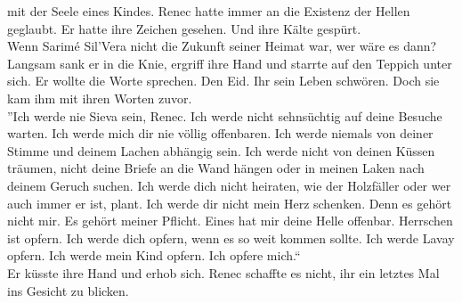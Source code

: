 mit der Seele eines Kindes. Renec hatte immer an die Existenz der Hellen geglaubt. Er hatte ihre 
Zeichen gesehen. Und ihre Kälte gespürt.\\
Wenn Sarimé Sil'Vera nicht die Zukunft seiner Heimat war, wer wäre es dann?\\
Langsam sank er in die Knie, ergriff ihre Hand und starrte auf den Teppich unter sich. Er wollte 
die Worte sprechen. Den Eid. Ihr sein Leben schwören. Doch sie kam ihm mit ihren Worten zuvor.\\
''Ich werde nie Sieva sein, Renec. Ich werde nicht sehnsüchtig auf deine Besuche warten. Ich werde 
mich dir nie völlig offenbaren. Ich werde niemals von deiner Stimme und deinem Lachen abhängig 
sein. Ich werde nicht von deinen Küssen träumen, nicht deine Briefe an die Wand hängen oder in 
meinen Laken nach deinem Geruch suchen. Ich werde dich nicht heiraten, wie der Holzfäller oder 
wer auch immer er ist, plant. Ich werde dir nicht mein Herz schenken. Denn es gehört nicht mir. 
Es gehört meiner Pflicht. Eines hat mir deine Helle offenbar. Herrschen ist opfern. Ich werde dich 
opfern, wenn es so weit kommen sollte. Ich werde Lavay opfern. Ich werde mein Kind opfern. Ich 
opfere mich.``\\
Er küsste ihre Hand und erhob sich. Renec schaffte es nicht, ihr ein letztes Mal ins Gesicht zu 
blicken.\\

